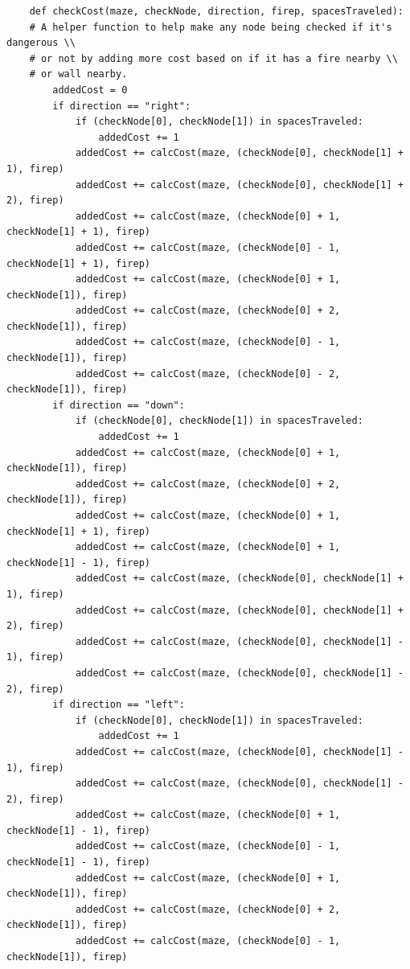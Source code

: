 \documentclass[11pt]{article}
\begin{document}
\begin{verbatim}
    def checkCost(maze, checkNode, direction, firep, spacesTraveled):
    # A helper function to help make any node being checked if it's dangerous \\
    # or not by adding more cost based on if it has a fire nearby \\
    # or wall nearby.
        addedCost = 0
        if direction == "right":
            if (checkNode[0], checkNode[1]) in spacesTraveled:
                addedCost += 1
            addedCost += calcCost(maze, (checkNode[0], checkNode[1] + 1), firep)
            addedCost += calcCost(maze, (checkNode[0], checkNode[1] + 2), firep)
            addedCost += calcCost(maze, (checkNode[0] + 1, checkNode[1] + 1), firep)
            addedCost += calcCost(maze, (checkNode[0] - 1, checkNode[1] + 1), firep)
            addedCost += calcCost(maze, (checkNode[0] + 1, checkNode[1]), firep)
            addedCost += calcCost(maze, (checkNode[0] + 2, checkNode[1]), firep)
            addedCost += calcCost(maze, (checkNode[0] - 1, checkNode[1]), firep)
            addedCost += calcCost(maze, (checkNode[0] - 2, checkNode[1]), firep)
        if direction == "down":
            if (checkNode[0], checkNode[1]) in spacesTraveled:
                addedCost += 1
            addedCost += calcCost(maze, (checkNode[0] + 1, checkNode[1]), firep)
            addedCost += calcCost(maze, (checkNode[0] + 2, checkNode[1]), firep)
            addedCost += calcCost(maze, (checkNode[0] + 1, checkNode[1] + 1), firep)
            addedCost += calcCost(maze, (checkNode[0] + 1, checkNode[1] - 1), firep)
            addedCost += calcCost(maze, (checkNode[0], checkNode[1] + 1), firep)
            addedCost += calcCost(maze, (checkNode[0], checkNode[1] + 2), firep)
            addedCost += calcCost(maze, (checkNode[0], checkNode[1] - 1), firep)
            addedCost += calcCost(maze, (checkNode[0], checkNode[1] - 2), firep)
        if direction == "left":
            if (checkNode[0], checkNode[1]) in spacesTraveled:
                addedCost += 1
            addedCost += calcCost(maze, (checkNode[0], checkNode[1] - 1), firep)
            addedCost += calcCost(maze, (checkNode[0], checkNode[1] - 2), firep)
            addedCost += calcCost(maze, (checkNode[0] + 1, checkNode[1] - 1), firep)
            addedCost += calcCost(maze, (checkNode[0] - 1, checkNode[1] - 1), firep)
            addedCost += calcCost(maze, (checkNode[0] + 1, checkNode[1]), firep)
            addedCost += calcCost(maze, (checkNode[0] + 2, checkNode[1]), firep)
            addedCost += calcCost(maze, (checkNode[0] - 1, checkNode[1]), firep)

\end{verbatim}
\end{document}

